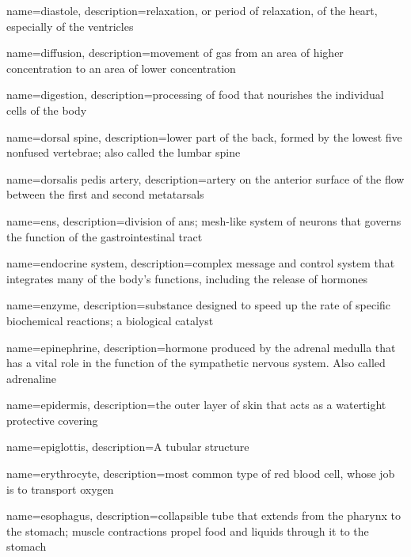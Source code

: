 \documentclass[../../EMT-169.tex]{subfiles}
\begin{document}
	{
		name=diastole,
		description={relaxation, or period of relaxation, of the heart, especially of the ventricles}
	}
	
	{
		name=diffusion,
		description={movement of gas from an area of higher concentration to an area of lower concentration}
	}

	{
		name=digestion,
		description={processing of food that nourishes the individual cells of the body}
	}
	
	{
		name=dorsal spine,
		description={lower part of the back, formed by the lowest five nonfused vertebrae; also called the lumbar spine}
	}
	
	{
		name=dorsalis pedis artery,
		description={artery on the anterior surface of the flow between the first and second metatarsals}
	}

	{
		name=\acrlong{ens},
		description={division of \acrlong{ans}; mesh-like system of neurons that governs the function of the gastrointestinal tract}
	}

	{
		name=endocrine system,
		description={complex message and control system that integrates many of the body's functions, including the release of hormones}
	}
	
	{
		name=enzyme,
		description={substance designed to speed up the rate of specific biochemical reactions; a biological catalyst}
	}
	
	{
		name=epinephrine,
		description={hormone produced by the adrenal medulla that has a vital role in the function of the sympathetic nervous system.  Also called adrenaline}
	}

	{
		name=epidermis,
		description={the outer layer of skin that acts as a watertight protective covering}
	}

	{
		name=epiglottis,
		description={A tubular structure }
	}
	
	{
		name=erythrocyte,
		description={most common type of red blood cell, whose job is to transport oxygen}
	}
	
	{
		name=esophagus,
		description={collapsible tube that extends from the pharynx to the stomach; muscle contractions propel food and liquids through it to the stomach}
	}
	
\end{document}
